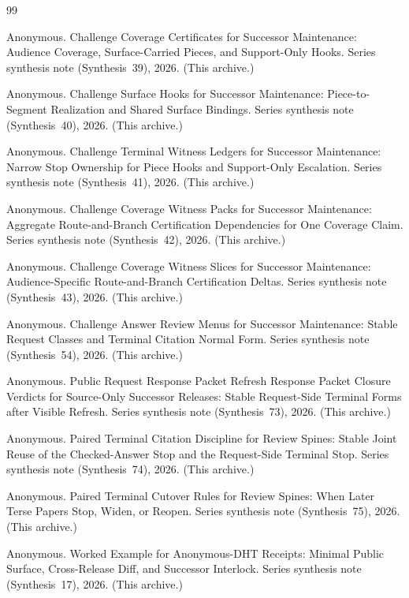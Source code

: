 \documentclass[11pt]{article}
\begin{document}
\begin{thebibliography}{99}\small

Anonymous.
\newblock Challenge Coverage Certificates for Successor Maintenance: Audience Coverage, Surface-Carried Pieces, and Support-Only Hooks.
\newblock Series synthesis note (Synthesis~39), 2026. (This archive.)

Anonymous.
\newblock Challenge Surface Hooks for Successor Maintenance: Piece-to-Segment Realization and Shared Surface Bindings.
\newblock Series synthesis note (Synthesis~40), 2026. (This archive.)

Anonymous.
\newblock Challenge Terminal Witness Ledgers for Successor Maintenance: Narrow Stop Ownership for Piece Hooks and Support-Only Escalation.
\newblock Series synthesis note (Synthesis~41), 2026. (This archive.)

Anonymous.
\newblock Challenge Coverage Witness Packs for Successor Maintenance: Aggregate Route-and-Branch Certification Dependencies for One Coverage Claim.
\newblock Series synthesis note (Synthesis~42), 2026. (This archive.)

Anonymous.
\newblock Challenge Coverage Witness Slices for Successor Maintenance: Audience-Specific Route-and-Branch Certification Deltas.
\newblock Series synthesis note (Synthesis~43), 2026. (This archive.)

Anonymous.
\newblock Challenge Answer Review Menus for Successor Maintenance: Stable Request Classes and Terminal Citation Normal Form.
\newblock Series synthesis note (Synthesis~54), 2026. (This archive.)

Anonymous.
\newblock Public Request Response Packet Refresh Response Packet Closure Verdicts for Source-Only Successor Releases: Stable Request-Side Terminal Forms after Visible Refresh.
\newblock Series synthesis note (Synthesis~73), 2026. (This archive.)

Anonymous.
\newblock Paired Terminal Citation Discipline for Review Spines: Stable Joint Reuse of the Checked-Answer Stop and the Request-Side Terminal Stop.
\newblock Series synthesis note (Synthesis~74), 2026. (This archive.)

Anonymous.
\newblock Paired Terminal Cutover Rules for Review Spines: When Later Terse Papers Stop, Widen, or Reopen.
\newblock Series synthesis note (Synthesis~75), 2026. (This archive.)

Anonymous.
\newblock Worked Example for Anonymous-DHT Receipts: Minimal Public Surface, Cross-Release Diff, and Successor Interlock.
\newblock Series synthesis note (Synthesis~17), 2026. (This archive.)

\end{thebibliography}
\end{document}
